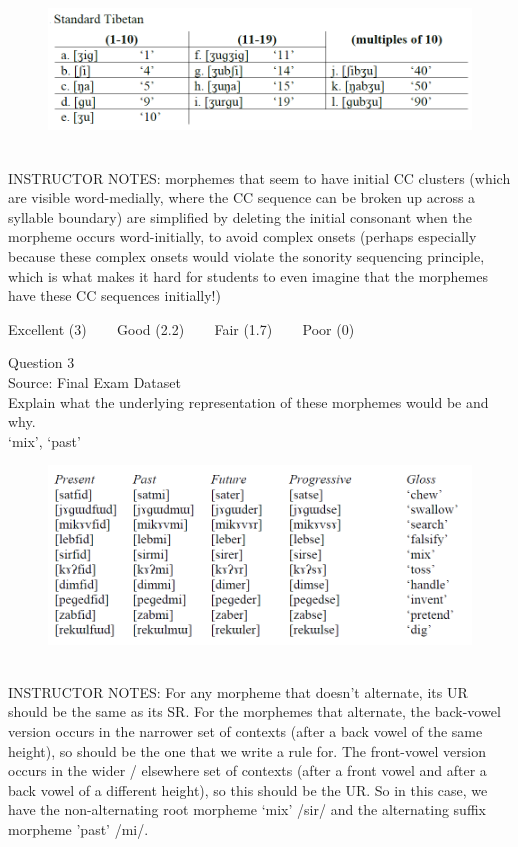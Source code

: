 \documentclass[12pt]{article}
\begin{document}
\begin{figure}[H]
\includegraphics{../images/tibetan.png}
\end{figure}

~\\
INSTRUCTOR NOTES: morphemes that seem to have initial CC clusters (which are visible word-medially, where the CC sequence can be broken up across a syllable boundary) are simplified by deleting the initial consonant when the morpheme occurs word-initially, to avoid complex onsets (perhaps especially because these complex onsets would violate the sonority sequencing principle, which is what makes it hard for students to even imagine that the morphemes have these CC sequences initially!)


\vfill
Excellent (3) ~~~ Good (2.2) ~~~ Fair (1.7) ~~~ Poor (0)
\newpage

{\large Question 3}\\

Source: Final Exam Dataset\\

Explain what the underlying representation of these morphemes would be and why.\\

`mix', `past'

\begin{figure}[H]
\includegraphics{../images/final_dataset.png}
\end{figure}

~\\
INSTRUCTOR NOTES: For any morpheme that doesn’t alternate, its UR should be the same as its SR.  For the morphemes that alternate, the back-vowel version occurs in the narrower set of contexts (after a back vowel of the same height), so should be the one that we write a rule for. The front-vowel version occurs in the wider / elsewhere set of contexts (after a front vowel and after a back vowel of a different height), so this should be the UR. So in this case, we have the non-alternating root morpheme ‘mix’ /sir/ and the alternating suffix morpheme 'past' /mi/.
\end{document}

